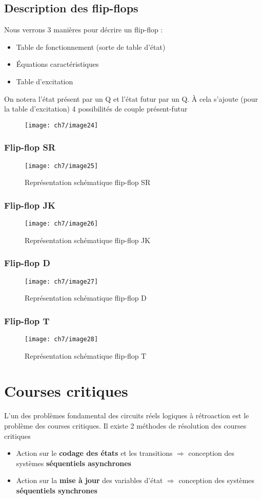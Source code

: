 \subsection{Description des flip-flops}
Nous verrons 3 manières pour décrire un flip-flop :
\begin{itemize}
	\item Table de fonctionnement (sorte de table d'état)
	\item Équations caractéristiques
	\item Table d'excitation 
\end{itemize}
On notera l'état présent par un Q et l'état futur par un Q\up{+}. À cela s'ajoute (pour la table d'excitation) 4 possibilités de couple présent-futur
\begin{figure}[H]
	\centering
	\texttt{[image: ch7/image24]}
\end{figure}
\subsubsection{Flip-flop SR}
\begin{figure}[H]
	\centering
	\texttt{[image: ch7/image25]}
	\caption{Représentation schématique flip-flop SR}
\end{figure}
\subsubsection{Flip-flop JK}
\begin{figure}[H]
	\centering
	\texttt{[image: ch7/image26]}
	\caption{Représentation schématique flip-flop JK}
\end{figure}
\subsubsection{Flip-flop D}
\begin{figure}[H]
	\centering
	\texttt{[image: ch7/image27]}
	\caption{Représentation schématique flip-flop D}
\end{figure}
\subsubsection{Flip-flop T}
\begin{figure}[H]
	\centering
	\texttt{[image: ch7/image28]}
	\caption{Représentation schématique flip-flop T}
\end{figure}
\section{Courses critiques}
L'un des problèmes fondamental des circuits réels logiques à rétroaction est le problème des courses critiques. Il existe 2 méthodes de résolution des courses critiques 
\begin{itemize}
	\item Action sur le \textbf{codage des états} et les transitions $\Rightarrow$ conception des systèmes \textbf{séquentiels asynchrones}
	\item Action sur la \textbf{mise à jour} des variables d'état $\Rightarrow$ conception des systèmes \textbf{séquentiels synchrones}
\end{itemize}
